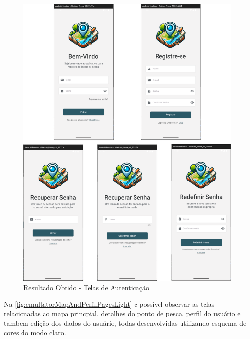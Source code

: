 \begin{figure}[H]
    \centering
    \caption{Resultado Obtido - Telas de Autenticação}
    \label{fig:emultatorAuthPagesLight}
    \includegraphics[scale=0.35]{./dados/figuras/emulator-auth-light-pages.png}
\end{figure}


Na \autoref{fig:emultatorMapAndPerfilPagesLight} é possível observar as telas relacionadas ao mapa princpial, detalhes do ponto de pesca, perfil do usuário e tambem edição dos dados do usuário, todas desenvolvidas utilizando esquema de cores do modo claro.

